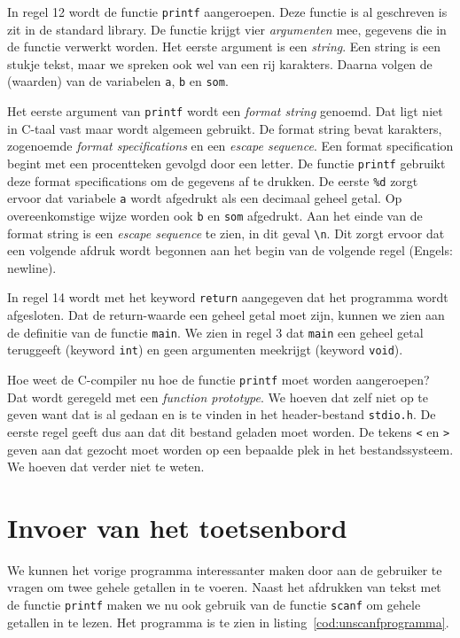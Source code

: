 In regel 12 wordt de functie \texttt{printf} aangeroepen. Deze functie is al geschreven is zit in de standard library. De functie krijgt vier \textsl{argumenten} mee, gegevens die in de functie verwerkt worden. Het eerste argument is een \textsl{string}. Een string is een stukje tekst, maar we spreken ook wel van een rij karakters. Daarna volgen de (waarden) van de variabelen \texttt{a}, \texttt{b} en \texttt{som}.

Het eerste argument van \texttt{printf} wordt een \textsl{format string} genoemd. Dat ligt niet in C-taal vast maar wordt algemeen gebruikt. De format string bevat karakters, zogenoemde \textsl{format specifications} en een \textsl{escape sequence}. Een format specification begint met een procentteken gevolgd door een letter. De functie \texttt{printf} gebruikt deze format specifications om de gegevens af te drukken. De eerste \texttt{\%d} zorgt ervoor dat variabele \texttt{a} wordt afgedrukt als een decimaal geheel getal. Op overeenkomstige wijze worden ook \texttt{b} en \texttt{som} afgedrukt. Aan het einde van de format string is een \textsl{escape sequence} te zien, in dit geval \texttt{\textbackslash n}. Dit zorgt ervoor dat een volgende afdruk wordt begonnen aan het begin van de volgende regel (Engels: newline).

In regel 14 wordt met het keyword \texttt{return} aangegeven dat het programma wordt afgesloten. 
Dat de return-waarde een geheel getal moet zijn, kunnen we zien aan de definitie van de functie \texttt{main}. We zien in regel 3 dat \texttt{main} een geheel getal teruggeeft (keyword \texttt{int}) en geen argumenten meekrijgt (keyword \texttt{void}).

Hoe weet de C-compiler nu hoe de functie \texttt{printf} moet worden aangeroepen? Dat wordt geregeld met een \textsl{function prototype}. We hoeven dat zelf niet op te geven want dat is al gedaan en is te vinden in het header-bestand \texttt{stdio.h}. De eerste regel geeft dus aan dat dit bestand geladen moet worden. De tekens \texttt{<} en \texttt{>} geven aan dat gezocht moet worden op een bepaalde plek in het bestandssysteem. We hoeven dat verder niet te weten.

\section{Invoer van het toetsenbord}
We kunnen het vorige programma interessanter maken door aan de gebruiker te vragen om twee gehele getallen in te voeren. Naast het afdrukken van tekst met de functie \texttt{printf} maken we nu ook gebruik van de functie \texttt{scanf} om gehele getallen in te lezen. Het programma is te zien in listing~\ref{cod:unscanfprogramma}.


